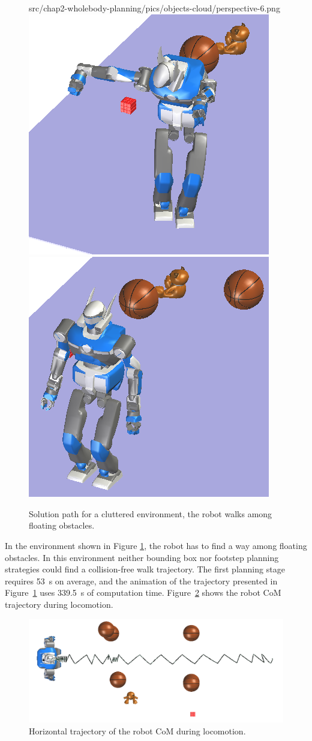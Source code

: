 \begin{figure}
                {src/chap2-wholebody-planning/pics/objects-cloud/perspective-6.png}
\includegraphics[width=0.24\linewidth]
                {src/chap2-wholebody-planning/pics/objects-cloud/perspective-7.png}
\includegraphics[width=0.24\linewidth]
                {src/chap2-wholebody-planning/pics/objects-cloud/perspective-8.png}

\caption{Solution path for a cluttered environment, the robot walks
  among floating obstacles.}
\label{fig:cluttered}
\end{figure}

In the environment shown in Figure \ref{fig:cluttered}, the robot has to
find a way among floating obstacles. In this environment neither
bounding box nor footstep planning strategies could find a
collision-free walk trajectory.  The first planning stage requires
53~s on average, and the animation of the trajectory presented in
Figure~\ref{fig:cluttered} uses 339.5~s of computation
time. Figure~\ref{fig:cluttered-waist} shows the robot CoM trajectory
during locomotion.

\begin{figure}
  \centering
  \includegraphics[width=0.7\linewidth]
                  {src/chap2-wholebody-planning/pics/objects-cloud/waist-trajectory.png}

  \caption{Horizontal trajectory of the robot CoM during
    locomotion.}
  \label{fig:cluttered-waist} 
\end{figure}


